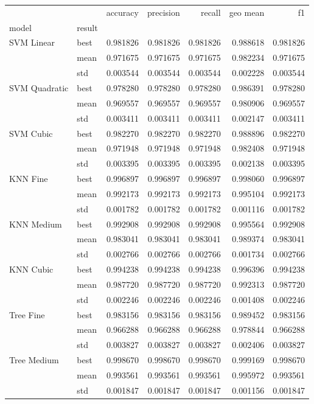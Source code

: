\begin{tabular}{llrrrrr}
\toprule
            &     &  accuracy &  precision &    recall &  geo mean &        f1 \\
model & result &           &            &           &           &           \\
\midrule
SVM Linear & best &  0.981826 &   0.981826 &  0.981826 &  0.988618 &  0.981826 \\
            & mean &  0.971675 &   0.971675 &  0.971675 &  0.982234 &  0.971675 \\
            & std &  0.003544 &   0.003544 &  0.003544 &  0.002228 &  0.003544 \\
SVM Quadratic & best &  0.978280 &   0.978280 &  0.978280 &  0.986391 &  0.978280 \\
            & mean &  0.969557 &   0.969557 &  0.969557 &  0.980906 &  0.969557 \\
            & std &  0.003411 &   0.003411 &  0.003411 &  0.002147 &  0.003411 \\
SVM Cubic & best &  0.982270 &   0.982270 &  0.982270 &  0.988896 &  0.982270 \\
            & mean &  0.971948 &   0.971948 &  0.971948 &  0.982408 &  0.971948 \\
            & std &  0.003395 &   0.003395 &  0.003395 &  0.002138 &  0.003395 \\
KNN Fine & best &  0.996897 &   0.996897 &  0.996897 &  0.998060 &  0.996897 \\
            & mean &  0.992173 &   0.992173 &  0.992173 &  0.995104 &  0.992173 \\
            & std &  0.001782 &   0.001782 &  0.001782 &  0.001116 &  0.001782 \\
KNN Medium & best &  0.992908 &   0.992908 &  0.992908 &  0.995564 &  0.992908 \\
            & mean &  0.983041 &   0.983041 &  0.983041 &  0.989374 &  0.983041 \\
            & std &  0.002766 &   0.002766 &  0.002766 &  0.001734 &  0.002766 \\
KNN Cubic & best &  0.994238 &   0.994238 &  0.994238 &  0.996396 &  0.994238 \\
            & mean &  0.987720 &   0.987720 &  0.987720 &  0.992313 &  0.987720 \\
            & std &  0.002246 &   0.002246 &  0.002246 &  0.001408 &  0.002246 \\
Tree Fine & best &  0.983156 &   0.983156 &  0.983156 &  0.989452 &  0.983156 \\
            & mean &  0.966288 &   0.966288 &  0.966288 &  0.978844 &  0.966288 \\
            & std &  0.003827 &   0.003827 &  0.003827 &  0.002406 &  0.003827 \\
Tree Medium & best &  0.998670 &   0.998670 &  0.998670 &  0.999169 &  0.998670 \\
            & mean &  0.993561 &   0.993561 &  0.993561 &  0.995972 &  0.993561 \\
            & std &  0.001847 &   0.001847 &  0.001847 &  0.001156 &  0.001847 \\
\bottomrule
\end{tabular}
